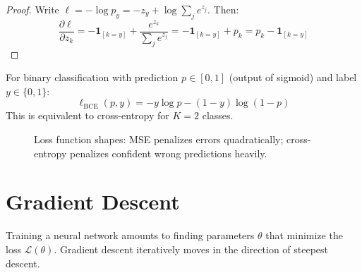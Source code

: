 \begin{proof}
    Write $\ell = -\log p_y = -z_y + \log\sum_{j} e^{z_j}$. Then:
    \[
        \frac{\partial \ell}{\partial z_k} = -\mathbf{1}_{[k=y]} + \frac{e^{z_k}}{\sum_j e^{z_j}} = -\mathbf{1}_{[k=y]} + p_k = p_k - \mathbf{1}_{[k=y]}
    \]
\end{proof}

\begin{definition}
    For binary classification with prediction $p \in [0,1]$ (output of sigmoid) and label $y \in \{0,1\}$:
    \[
        \ell_{\text{BCE}}(p, y) = -y\log p - (1-y)\log(1-p)
    \]
    This is equivalent to cross-entropy for $K=2$ classes.
\end{definition}

\begin{figure}[h]
\centering
\caption{Loss function shapes: MSE penalizes errors quadratically; cross-entropy penalizes confident wrong predictions heavily.}
\end{figure}

\section{Gradient Descent}

Training a neural network amounts to finding parameters $\theta$ that minimize the loss $\mathcal{L}(\theta)$. Gradient descent iteratively moves in the direction of steepest descent.

